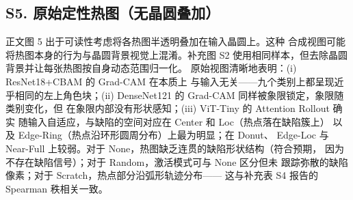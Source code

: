 \documentclass[11pt,a4paper]{article}
\begin{document}
\begin{table}[htbp]
\centering
\small
\caption{\textbf{补充表 S3.} 十二次运行的逐种子分类结果}
\end{table}

\subsection*{S5. 原始定性热图（无晶圆叠加）}

正文图 5 出于可读性考虑将各热图半透明叠加在输入晶圆上。这种 合成视图可能将热图本身的行为与晶圆背景视觉上混淆。补充图 S2 使用相同样本，但去除晶圆背景并让每张热图按自身动态范围归一化。 原始视图清晰地表明：(i) ResNet18+CBAM 的 Grad-CAM 在本质上 与输入无关——九个类别上都呈现近乎相同的左上角色块；(ii) DenseNet121 的 Grad-CAM 同样被象限锁定，象限随类别变化，但 在象限内部没有形状感知；(iii) ViT-Tiny 的 Attention Rollout 确实 随输入自适应，与缺陷的空间对应在 Center 和 Loc（热点落在缺陷簇上） 以及 Edge-Ring（热点沿环形圆周分布）上最为明显；在 Donut、 Edge-Loc 与 Near-Full 上较弱。对于 None，热图缺乏连贯的缺陷形状结构（符合预期， 因为不存在缺陷信号）；对于 Random，激活模式可与 None 区分但未 跟踪弥散的缺陷像素；对于 Scratch，热点部分沿弧形轨迹分布—— 这与补充表 S4 报告的 Spearman 秩相关一致。
\end{document}
